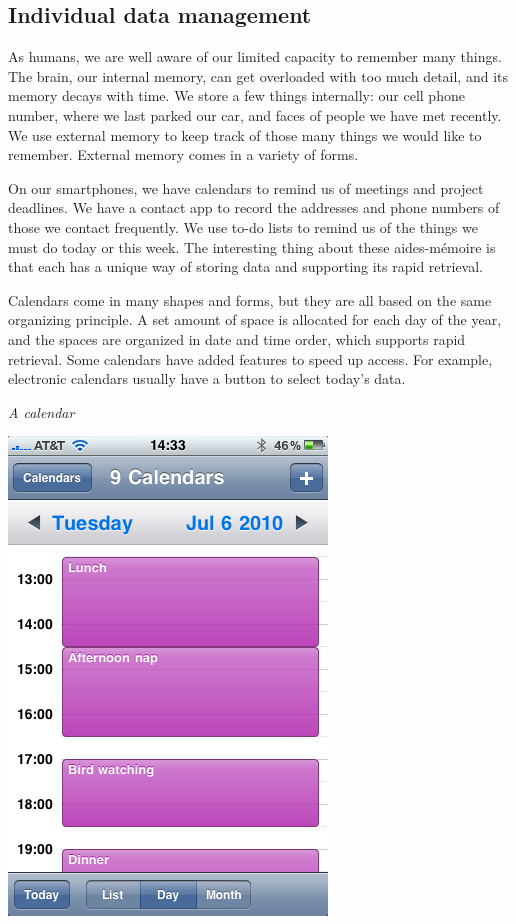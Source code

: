 \documentclass[
]{article}
\begin{document}
\hypertarget{individual-data-management}{%
\subsection*{Individual data management}\label{individual-data-management}}

As humans, we are well aware of our limited capacity to remember many
things. The brain, our internal memory, can get overloaded with too much
detail, and its memory decays with time. We store a few things
internally: our cell phone number, where we last parked our car, and
faces of people we have met recently. We use external memory to keep
track of those many things we would like to remember. External memory
comes in a variety of forms.

On our smartphones, we have calendars to remind us of meetings and
project deadlines. We have a contact app to record the addresses and
phone numbers of those we contact frequently. We use to-do lists to
remind us of the things we must do today or this week. The interesting
thing about these aides-mémoire is that each has a unique way of storing
data and supporting its rapid retrieval.

Calendars come in many shapes and forms, but they are all based on the
same organizing principle. A set amount of space is allocated for each
day of the year, and the spaces are organized in date and time order,
which supports rapid retrieval. Some calendars have added features to
speed up access. For example, electronic calendars usually have a button
to select today's data.

\emph{A calendar}

\includegraphics{Figures/Chapter 1/calendar.png}
\end{document}
